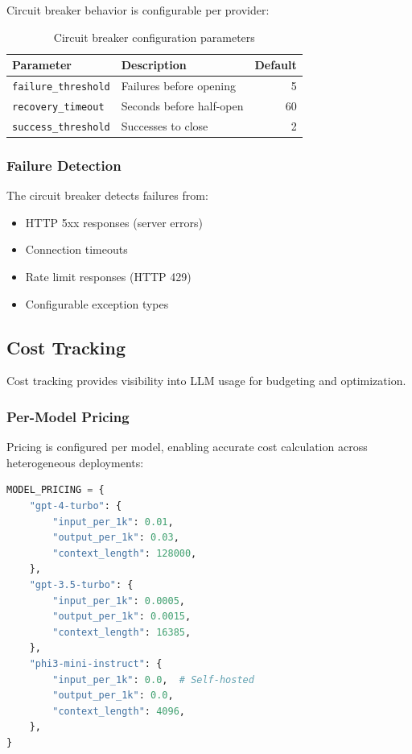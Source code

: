 Circuit breaker behavior is configurable per provider:

\begin{table}[htbp]
\centering
\caption{Circuit breaker configuration parameters}
\label{tab:circuit-params}
\begin{tabular}{llr}
\hline
\textbf{Parameter} & \textbf{Description} & \textbf{Default} \\
\hline
\texttt{failure\_threshold} & Failures before opening & 5 \\
\texttt{recovery\_timeout} & Seconds before half-open & 60 \\
\texttt{success\_threshold} & Successes to close & 2 \\
\hline
\end{tabular}
\end{table}

\subsubsection{Failure Detection}

The circuit breaker detects failures from:
\begin{itemize}
    \item HTTP 5xx responses (server errors)
    \item Connection timeouts
    \item Rate limit responses (HTTP 429)
    \item Configurable exception types
\end{itemize}

\subsection{Cost Tracking}
\label{subsubsec:cost-tracking}

Cost tracking provides visibility into LLM usage for budgeting and optimization.

\subsubsection{Per-Model Pricing}

Pricing is configured per model, enabling accurate cost calculation across heterogeneous deployments:

\begin{lstlisting}[language=Python, caption={Model pricing configuration}, label=lst:model-pricing]
MODEL_PRICING = {
    "gpt-4-turbo": {
        "input_per_1k": 0.01,
        "output_per_1k": 0.03,
        "context_length": 128000,
    },
    "gpt-3.5-turbo": {
        "input_per_1k": 0.0005,
        "output_per_1k": 0.0015,
        "context_length": 16385,
    },
    "phi3-mini-instruct": {
        "input_per_1k": 0.0,  # Self-hosted
        "output_per_1k": 0.0,
        "context_length": 4096,
    },
}
\end{lstlisting}

